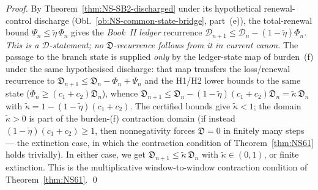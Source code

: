 \documentclass[12pt,oneside]{amsbook}
\theoremstyle{plain}
\theoremstyle{definition}
\theoremstyle{remark}
\begin{document}
\begin{proof}
By Theorem~\ref{thm:NS-SB2-discharged} under its hypothetical
renewal-control discharge (Obl.~\ref{ob:NS-common-state-bridge},
part~(e)), the total-renewal bound
$\Psi_n \leq \widetilde\eta\,\Phi_n$ gives the \emph{Book~II
ledger} recurrence
$\mathcal{D}_{n+1} \leq \mathcal{D}_n -
(1-\widetilde\eta)\Phi_n$. \emph{This is a
$\mathcal{D}$-statement; no $\mathfrak{D}$-recurrence follows
from it in current canon.} The passage to the branch state is
supplied \emph{only} by the ledger-state map of burden~(f) under
the same hypothesised discharge: that map transfers the
loss/renewal recurrence to
$\mathfrak{D}_{n+1} \leq \mathfrak{D}_n - \Phi_n + \Psi_n$ and
the H1/H2 lower bounds to the same state
($\Phi_n \geq (c_1+c_2)\mathfrak{D}_n$), whence
$\mathfrak{D}_{n+1} \leq \mathfrak{D}_n -
(1-\widetilde\eta)(c_1+c_2)\mathfrak{D}_n
= \widetilde\kappa\,\mathfrak{D}_n$ with
$\widetilde\kappa = 1 - (1-\widetilde\eta)(c_1+c_2)$. The
certified bounds give $\widetilde\kappa < 1$; the domain
$\widetilde\kappa > 0$ is part of the burden-(f) contraction
domain (if instead $(1-\widetilde\eta)(c_1+c_2) \geq 1$, then
nonnegativity forces $\mathfrak{D} = 0$ in finitely many steps ---
the extinction case, in which the contraction condition of
Theorem~\ref{thm:NS61} holds trivially). In either case, we get
$\mathfrak{D}_{n+1} \leq \widetilde\kappa\,\mathfrak{D}_n$
with $\widetilde\kappa \in (0,1)$, or finite extinction. This is
the multiplicative window-to-window contraction condition of
Theorem~\ref{thm:NS61}. \qed
\end{proof}
\end{document}
